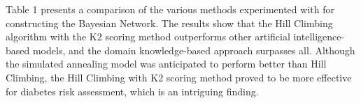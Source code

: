 \documentclass[letterpaper]{article}
\begin{document}
Table 1 presents a comparison of the various methods experimented with for constructing the Bayesian Network. The results show that the Hill Climbing algorithm with the K2 scoring method outperforms other artificial intelligence-based models, and the domain knowledge-based approach surpasses all. Although the simulated annealing model was anticipated to perform better than Hill Climbing, the Hill Climbing with K2 scoring method proved to be more effective for diabetes risk assessment, which is an intriguing finding.

\end{document}
